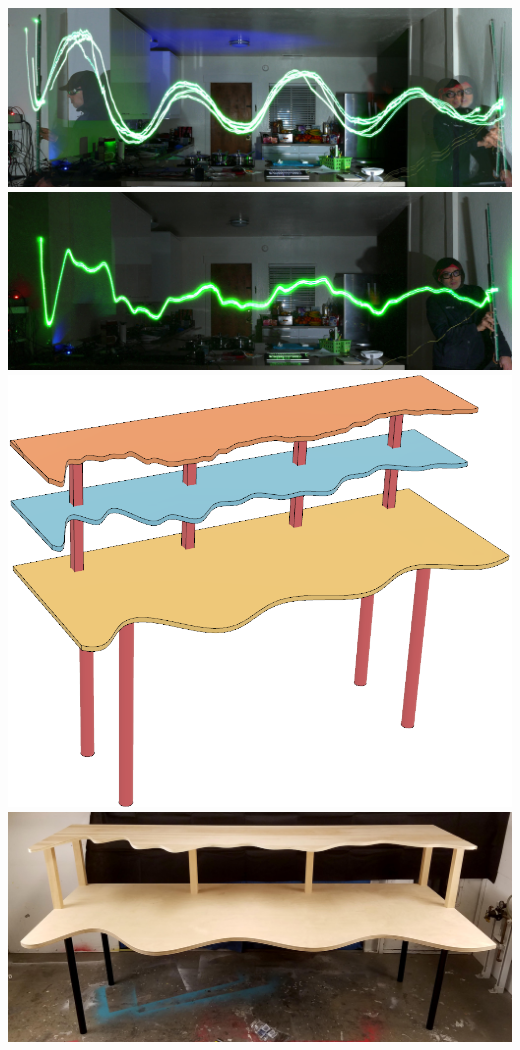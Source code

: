 \documentclass{sigchi-ext}
\begin{document}
\begin{marginfigure}[-20pc]
  \begin{minipage}{\marginparwidth}
  \includegraphics[width=\linewidth]{threefundamentals_and_me_dccq.jpg}
  \includegraphics[width=\linewidth]{wave87_and_me90_dccq.jpg}
  \includegraphics[width=\linewidth]{WaveTableFusion360.png}
  \includegraphics[width=\linewidth]{wavetable_20161129_214045cq.jpg}

\end{minipage}
\end{marginfigure}
\end{document}
